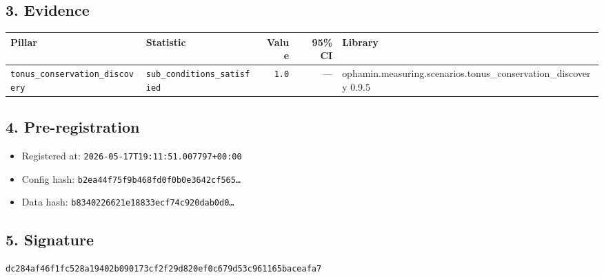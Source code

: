 \documentclass{article}
\begin{document}
\subsection*{3. Evidence}
\begin{tabular}{llrrl}\toprule
\textbf{Pillar} & \textbf{Statistic} & \textbf{Value} & \textbf{95\% CI} & \textbf{Library} \\\midrule
\texttt{tonus\_conservation\_discovery} & \texttt{sub\_conditions\_satisfied} & \texttt{1.0} & --- & ophamin.measuring.scenarios.tonus\_conservation\_discovery 0.9.5 \\
\bottomrule\end{tabular}
\subsection*{4. Pre-registration}
\begin{itemize}
\item Registered at: \texttt{2026-05-17T19:11:51.007797+00:00}
\item Config hash: \texttt{b2ea44f75f9b468fd0f0b0e3642cf565\dots}
\item Data hash: \texttt{b8340226621e18833ecf74c920dab0d0\dots}
\end{itemize}
\subsection*{5. Signature}
\texttt{dc284af46f1fc528a19402b090173cf2f29d820ef0c679d53c961165baceafa7}\\
\end{document}

